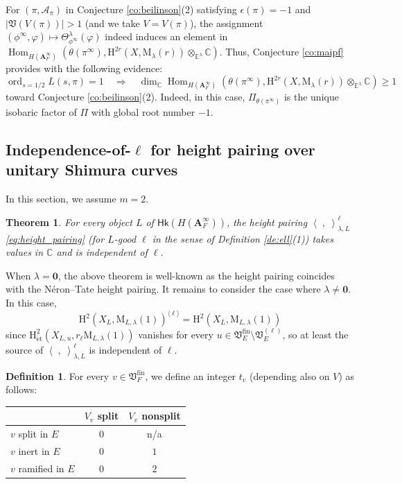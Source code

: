 \documentclass[12pt]{amsart}
\numberwithin{equation}{section}
\theoremstyle{plain}
\newtheorem{theorem}[proposition]{Theorem}
\theoremstyle{definition}
\newtheorem{definition}[proposition]{Definition}
\theoremstyle{remark}
\renewcommand{\b}[1]{\mathbf{#1}}
\renewcommand{\c}[1]{\mathcal{#1}}
\renewcommand{\d}[1]{\mathbb{#1}}
\newcommand{\f}[1]{\mathfrak{#1}}
\renewcommand{\r}[1]{\mathrm{#1}}
\renewcommand{\sf}[1]{\mathsf{#1}}
\renewcommand{\(}{\left(}
\renewcommand{\)}{\right)}
\newcommand{\ang}[1]{\langle{#1}\rangle}
\renewcommand{\geq}{\geqslant}
\newcommand{\bA}{\b A}
\newcommand{\cA}{\c A}
\newcommand{\dC}{\d C}
\newcommand{\dE}{\d E}
\newcommand{\fV}{\f V}
\newcommand{\rH}{\r H}
\newcommand{\rM}{\r M}
\newcommand{\llangle}{\left\langle}
\newcommand{\rrangle}{\right\rangle}
\newcommand{\et}{{\acute{\r{e}}\r{t}}}
\newcommand{\fin}{\r{fin}}
\newcommand{\Hk}{\sf{Hk}}
\DeclareMathOperator{\Hom}{Hom}
\DeclareMathOperator{\ord}{ord}
\begin{document}
For $(\pi,\cA_\pi)$ in Conjecture \ref{co:beilinson}(2) satisfying $\epsilon(\pi)=-1$ and $|\fV(V(\pi))|>1$ (and we take $V=V(\pi)$), the assignment $(\phi^\infty,\varphi)\mapsto\Theta_{\phi^\infty}^\lambda(\varphi)$ indeed induces an element in $\Hom_{H(\bA_F^\infty)}\(\theta(\pi^\infty),\rH^{2r}(X,\rM_{\lambda}(r))\otimes_{\dE^\lambda}\dC\)$. Thus, Conjecture \ref{co:maipf} provides with the following evidence:
\[
\ord_{s=1/2}L(s,\pi)=1 \quad\Longrightarrow\quad
\dim_\dC\Hom_{H(\bA_F^\infty)}\(\theta(\pi^\infty),\rH^{2r}(X,\rM_{\lambda}(r))\otimes_{\dE^\lambda}\dC\)\geq 1
\]
toward Conjecture \ref{co:beilinson}(2). Indeed, in this case, $\Pi_{\theta(\pi^\infty)}$ is the unique isobaric factor of $\Pi$ with global root number $-1$.




\subsection{Independence-of-$\ell$ for height pairing over unitary Shimura curves}
\label{ss:independence}

In this section, we assume $m=2$.


\begin{theorem}\label{th:independence}
For every object $L$ of $\Hk(H(\bA_F^\infty))$, the height pairing $\llangle\;,\;\rrangle_{\lambda,L}^{\ell}$ \eqref{eq:height_pairing} (for $L$-good $\ell$ in the sense of Definition \ref{de:ell}(1)) takes values in $\dC$ and is independent of $\ell$.
\end{theorem}


When $\lambda=\b{0}$, the above theorem is well-known as the height pairing coincides with the N\'{e}ron--Tate height pairing. It remains to consider the case where $\lambda\neq\b{0}$. In this case,
\[
\rH^2(X_L,\rM_{L,\lambda}(1))^{\ang\ell}=\rH^2(X_L,\rM_{L,\lambda}(1))
\]
since $\rH^2_{\et}(X_{L,u},r_\ell\rM_{L,\lambda}(1))$ vanishes for every $u\in\fV_E^\fin\setminus\fV_E^{(\ell)}$, so at least the source of $\llangle\;,\;\rrangle_{\lambda,L}^{\ell}$ is independent of $\ell$.





\begin{definition}\label{re:optimal}
For every $v\in\fV_F^\fin$, we define an integer $t_v$ (depending also on $V$) as follows:
\center
\begin{tabular}{|l|c|c|}
  \hline
   &  $V_v$ split &  $V_v$ nonsplit \\ \hline
   $v$ split in $E$ & $0$ & n/a \\ \hline
   $v$ inert in $E$  & $0$ & $1$ \\ \hline
   $v$ ramified in $E$ & $0$ & $2$ \\
  \hline
\end{tabular}
\center
\end{definition}
\end{document}
